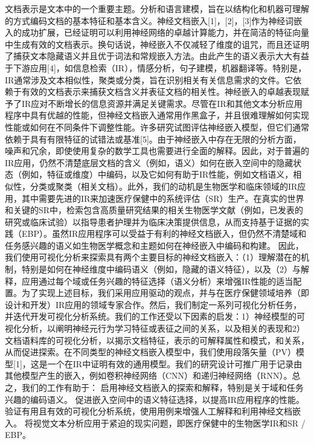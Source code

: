 文档表示是文本中的一个重要主题。分析和语言建模，旨在以结构化和机器可理解的方式编码文档的基本特征和基本含义。神经文档嵌入[1]，[2]，[3]作为神经词嵌入的成功扩展，已经证明可以利用神经网络的卓越计算能力，并在简洁的特征向量中生成有效的文档表示。换句话说，神经嵌入不仅减轻了维度的诅咒，而且还证明了捕获文本隐藏语义并且优于词法和常规嵌入方法。由此产生的语义表示大大有益于下游应用[4]，如信息检索（IR），情感分析，句子建模，机器翻译等。特别是，IR通常涉及文本相似性，聚类或分类，旨在识别相关有关信息需求的文件。它依赖于有效的文档表示来捕获文档含义并表征文档的相关性。神经嵌入的卓越表现赋予了IR应对不断增长的信息资源并满足关键需求。尽管在IR和其他文本分析应用程序中具有优越的性能，但神经文档嵌入通常用作黑盒子，并且很难理解如何实现性能或如何在不同条件下调整性能。许多研究试图评估神经嵌入模型，但它们通常依赖于具有有限特征的试错法或基准[5]。由于神经嵌入中存在无限的分析方面，噪声和冗余，即使使用复杂的数学工具也需要进行全面的解释。因此，对于普遍的IR应用，仍然不清楚底层文档的含义（例如，语义）如何在嵌入空间中的隐藏状态（例如，特征或维度）中编码，以及它如何有助于IR性能，例如文档语义，相似性，分类或聚类（相关文档）。此外，我们的动机是生物医学和临床领域的IR应用，其中需要先进的IR来加速医疗保健中的系统评估（SR）生产。在真实的世界和关键的SR中，检索包含高质量研究结果的相关生物医学文献（例如，已发表的研究或临床试验）以指导患者护理并为临床决策提供信息，从而支持基于证据的实践（EBP）。虽然IR应用程序可以受益于有利的神经文档嵌入，但仍然不清楚域和任务感兴趣的语义如生物医学概念和主题如何在神经嵌入中编码和构建。
因此，我们使用可视化分析来探索具有两个主要目标的神经文档嵌入：（1）理解潜在的机制，特别是如何在神经维度中编码语义（例如，隐藏的语义特征），以及（2）与解释，应用通过每个域或任务兴趣的特征选择（语义分析）来增强IR性能的适当配置。为了实现上述目标，我们采用应用驱动的观点，并与在医疗保健领域培养（即设计和开发）IR应用的领域专家合作。然后，我们制定一系列可视化分析任务，并迭代开发可视化分析系统。我们的工作还受以下因素的启发：1）神经模型的可视化分析，以阐明神经元行为学习特征或表征之间的关系，以及相关的表现和2）文档语料库的可视化分析，以揭示文档特征，表示的可解释属性和模式，和关系，从而促进探索。在不同类型的神经文档嵌入模型中，我们使用段落矢量（PV）模型[1]，这是一个在IR中证明有效的通用模型。我们的研究设计可推广用于记录由其他模型产生的嵌入，例如卷积神经网络（CNN）和递归神经网络（RNN）。总之，我们的工作有助于：
启用神经文档嵌入的探索和解释，特别是关于域和任务兴趣的编码语义。
促进嵌入空间中的语义特征选择，以提高IR应用程序的性能。
验证有用且有效的可视化分析系统，使用用例来增强人工解释和利用神经文档嵌入。
将视觉文本分析应用于紧迫的现实问题，即医疗保健中的生物医学IR和SR / EBP。